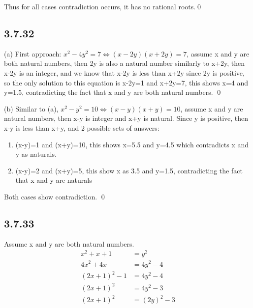 \documentclass{article}
\begin{document}
Thus for all cases contradiction occurs, it has no rational roots.\qed

\subsection*{3.7.32}

(a) First approach: $x^2-4y^2=7\iff (x-2y)(x+2y)=7$, assume x and y are both natural numbers, then 2y is also a natural number similarly to x+2y, then x-2y is an integer, and we know that x-2y is less than x+2y since 2y is positive, so the only solution to this equation is x-2y=1 and x+2y=7, this shows x=4 and y=1.5, contradicting the fact that x and y are both natural numbers. \qed


(b) Similar to (a), $x^2-y^2=10 \iff (x-y)(x+y)=10$, assume x and y are natural numbers, then x-y is integer and x+y is natural. Since y is positive, then x-y is less than x+y, and 2 possible sets of answers:
\begin{enumerate}
    \item (x-y)=1 and (x+y)=10, this shows x=5.5 and y=4.5 which contradicts x and y as naturals.
    \item (x-y)=2 and (x+y)=5, this show x as 3.5 and y=1.5, contradicting the fact that x and y are naturals
\end{enumerate}
Both cases show contradiction. \qed

\subsection*{3.7.33}

Assume x and y are both natural numbers.
\begin{align*}
     x^2+x+1&=y^2\\
     4x^2+4x&=4y^2-4\\
     (2x+1)^2-1&=4y^2-4\\
     (2x+1)^2&=4y^2-3\\
     (2x+1)^2&=(2y)^2-3
\end{align*}
\end{document}
